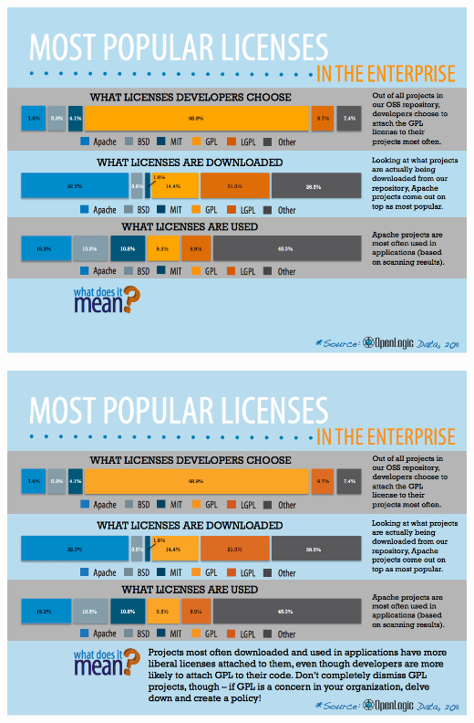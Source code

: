 \documentclass{beamer}
\begin{document}
\begin{frame}
\vspace{-0.25cm}
\begin{center}
\includegraphics[scale=0.29,clip=true]{figs/MostPopularLicensesInTheEnterprise3.png}

\end{center}
\end{frame}


\begin{frame}
\vspace{-0.25cm}
\begin{center}
\includegraphics[scale=0.29,clip=true]{figs/MostPopularLicensesInTheEnterprise.png}

\end{center}
\end{frame}
\end{document}
